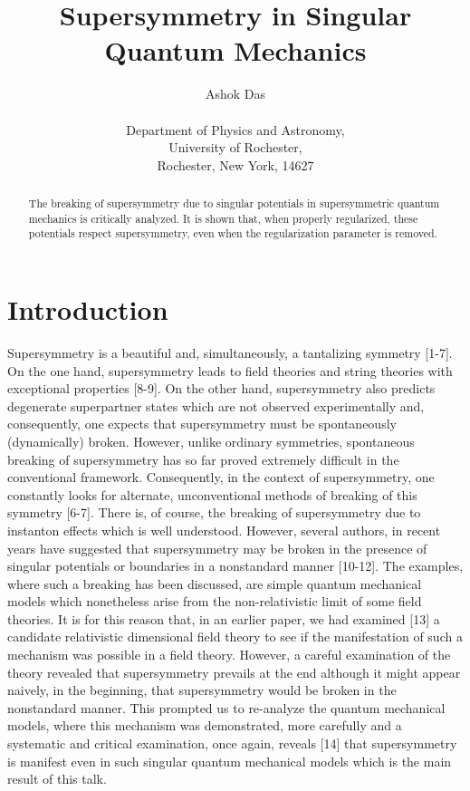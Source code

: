 \documentclass[a4paper,11pt]{article}
\begin{document}
  


\title{ 
{\bf Supersymmetry in Singular Quantum Mechanics}}
\author{Ashok Das \\
\\
Department of Physics and Astronomy, \\
University of Rochester,\\
Rochester, New York, 14627}
\date{}
\maketitle


\begin{abstract}
The breaking of supersymmetry due to singular potentials
in supersymmetric quantum mechanics is critically analyzed. It
is shown that, when properly regularized, these potentials
respect supersymmetry, even when the regularization parameter is removed. 
\end{abstract}

\section{Introduction}

Supersymmetry is a beautiful and, simultaneously, a tantalizing
symmetry [1-7]. On the one hand, supersymmetry leads to field theories and
string theories with exceptional properties [8-9]. On the other hand,
supersymmetry also predicts degenerate superpartner states which are
not  observed experimentally and, consequently, one expects
that supersymmetry must be spontaneously (dynamically)
broken. However, unlike ordinary symmetries, spontaneous breaking of
supersymmetry has so far proved extremely difficult in the
conventional framework. Consequently, in the context of supersymmetry,
one constantly looks for alternate, unconventional methods of breaking
of this symmetry [6-7]. There is, of course, the breaking of supersymmetry
due to instanton effects which is well understood. However, several
authors, in recent years have suggested that supersymmetry may be
broken in the presence of singular potentials or boundaries in a
nonstandard manner [10-12]. 
The examples, where such a breaking has been discussed, are simple
quantum mechanical models which nonetheless arise from the
non-relativistic limit of some field theories. It is for this reason
that, in an earlier paper, we had examined [13] a candidate relativistic
\coordHE{} dimensional field theory to see if the manifestation of such a
mechanism was possible in a field theory. However, a careful
examination  of the theory revealed that
supersymmetry prevails at the end although  it might appear naively, in
the beginning, that  supersymmetry would be broken in the nonstandard
manner. This prompted us to re-analyze the quantum mechanical models,
where this mechanism was demonstrated, more carefully and a
systematic and  critical examination,
once again, reveals [14] that  supersymmetry is
manifest even in such singular quantum mechanical models which is the
main result of this talk.
\end{document}
